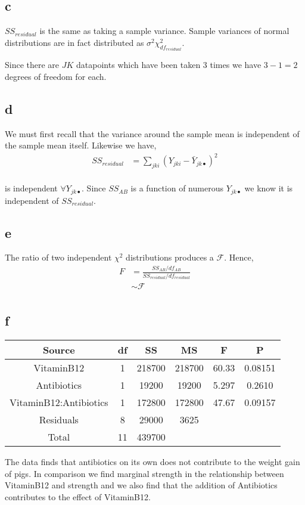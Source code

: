 \documentclass{article}
\begin{document}
\subsection{c}
$SS_{residual}$ is the same as taking a sample variance. Sample variances of
normal distributions are in fact distributed as
$\sigma^2 \chi^2_{df_{residual}}$.

Since there are $JK$ datapoints which have been taken 3 times we have $3-1 = 2$
degrees of freedom for each.

\subsection{d}
We must first recall that the variance around the sample mean is independent of
the sample mean itself. Likewise we have,
\begin{align*}
    SS_{residual} &= \sum_{jki} (Y_{jki} - \bar{Y}_{jk\bullet})^2 \\
\end{align*}

is independent $\forall Y_{jk\bullet}$. Since $SS_{AB}$ is a function of
numerous $Y_{jk\bullet}$ we know it is independent of $SS_{residual}$.

\subsection{e}
The ratio of two independent $\chi^2$ distributions produces a
$\mathcal{F}$. Hence,
\begin{align*}
    F &= \frac{SS_{AB}/df_{AB}}{SS_{residual}/df_{residual}} \\
    &\sim \mathcal{F} \\
\end{align*}

\subsection{f}
\begin{center}
    \begin{tabular}{c c c c c c}
        Source & df & SS & MS & F & P \\
        \hline
        VitaminB12 & 1 & 218700 & 218700 & 60.33 & 0.08151 \\
        Antibiotics & 1 & 19200 & 19200 & 5.297 & 0.2610 \\
        VitaminB12:Antibiotics & 1 & 172800 & 172800 & 47.67 & 0.09157 \\
        Residuals & 8 & 29000 & 3625 &  &  \\
        \hline
        Total & 11 & 439700 &  &  &  \\
    \end{tabular}
\end{center}

The data finds that antibiotics on its own does not contribute
to the weight gain of pigs. In comparison we find marginal strength
in the relationship between VitaminB12 and strength and we also find
that the addition of Antibiotics contributes to the effect of
VitaminB12.
\end{document}
